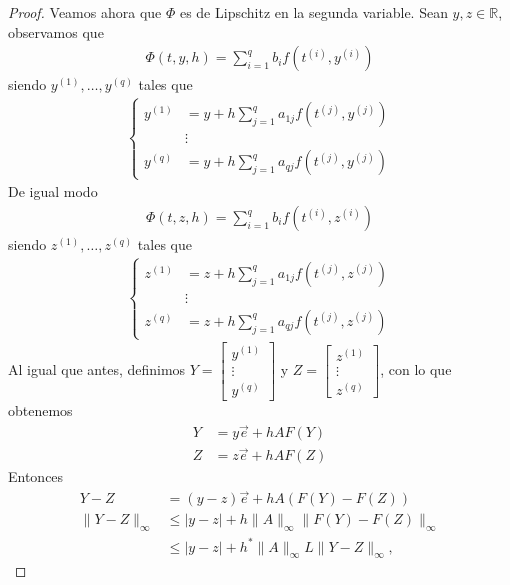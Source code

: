 \begin{proof}
Veamos ahora que $\Phi$ es de Lipschitz en la segunda variable. Sean $y,z \in \mathbb{R}$, observamos que
\begin{align*}
    \Phi(t,y,h) = \sum_{i=1}^{q}b_if(t^{(i)},y^{(i)})
\end{align*}
siendo $y^{(1)},\ldots,y^{(q)}$ tales que
\begin{align*}
    \left\{ \begin{array}{lcc}
             y^{(1)} & = y + h\sum_{j=1}^{q}a_{1j}f(t^{(j)},y^{(j)})\\
            & \vdots \\
            y^{(q)} &= y + h\sum_{j=1}^{q}a_{qj}f(t^{(j)},y^{(j)})
             \end{array}
   \right.
\end{align*}
De igual modo
\begin{align*}
    \Phi(t,z,h) = \sum_{i=1}^{q}b_if(t^{(i)},z^{(i)})
\end{align*}
siendo $z^{(1)},\ldots,z^{(q)}$ tales que
\begin{align*}
    \left\{ \begin{array}{lcc}
             z^{(1)} & = z + h\sum_{j=1}^{q}a_{1j}f(t^{(j)},z^{(j)})\\
            & \vdots \\
            z^{(q)} &= z + h\sum_{j=1}^{q}a_{qj}f(t^{(j)},z^{(j)})
             \end{array}
   \right.
\end{align*}
Al igual que antes, definimos $Y = \begin{bmatrix}
y^{(1)}\\
\vdots \\
y^{(q)} 
\end{bmatrix}$ y $Z = \begin{bmatrix}
z^{(1)}\\
\vdots \\
z^{(q)} 
\end{bmatrix}$, con lo que obtenemos
\begin{align*}
    Y &= y\overrightarrow{e} + hAF(Y) \\
    Z &= z\overrightarrow{e} + hAF(Z)
\end{align*}
Entonces
\begin{align*}
    Y - Z  &= (y-z)\overrightarrow{e} + hA(F(Y) - F(Z)) \\
    \|Y-Z\|_{\infty} & \leq |y-z| + h\|A\|_{\infty}\|F(Y) -F(Z)\|_{\infty} \\
    &\leq |y-z| + h^*\|A\|_{\infty}L\|Y-Z\|_{\infty},
\end{align*}

\end{proof}
